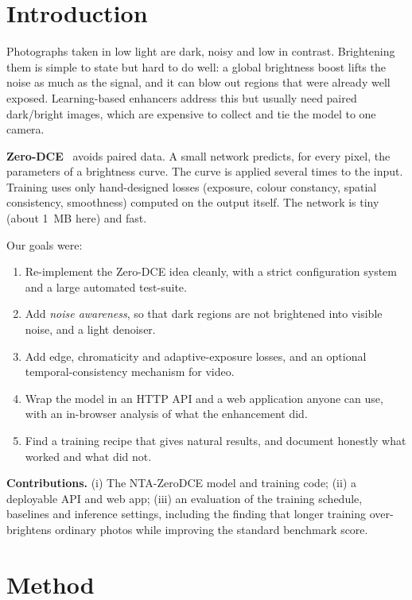 \documentclass{article}
\begin{document}
\section{Introduction}
Photographs taken in low light are dark, noisy and low in contrast. Brightening them is simple to state but hard to do well: a global brightness boost lifts the noise as much as the signal, and it can blow out regions that were already well exposed. Learning-based enhancers address this but usually need paired dark/bright images, which are expensive to collect and tie the model to one camera.

\textbf{Zero-DCE}~\cite{zerodce} avoids paired data. A small network predicts, for every pixel, the parameters of a brightness curve. The curve is applied several times to the input. Training uses only hand-designed losses (exposure, colour constancy, spatial consistency, smoothness) computed on the output itself. The network is tiny (about 1~MB here) and fast.

Our goals were:
\begin{enumerate}[nosep]
  \item Re-implement the Zero-DCE idea cleanly, with a strict configuration system and a large automated test-suite.
  \item Add \emph{noise awareness}, so that dark regions are not brightened into visible noise, and a light denoiser.
  \item Add edge, chromaticity and adaptive-exposure losses, and an optional temporal-consistency mechanism for video.
  \item Wrap the model in an HTTP API and a web application anyone can use, with an in-browser analysis of what the enhancement did.
  \item Find a training recipe that gives natural results, and document honestly what worked and what did not.
\end{enumerate}

\textbf{Contributions.} (i) The NTA-ZeroDCE model and training code; (ii) a deployable API and web app; (iii) an evaluation of the training schedule, baselines and inference settings, including the finding that longer training over-brightens ordinary photos while improving the standard benchmark score.

\section{Method}\label{sec:method}
\end{document}
